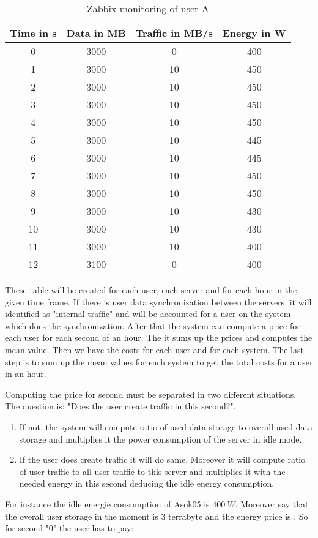  
 \begin{table}
 \centering
 \caption{Zabbix monitoring of user A}
 \begin{tabular}{|c|c|c|c|}
  \hline Time in s & Data in MB & Traffic in MB/s & Energy in W \\ 
   \hline 0 & 3000 & 0 & 400 \\ 
  \hline 1 & 3000 & 10 & 450 \\ 
  \hline 2 & 3000 & 10 & 450 \\ 
  \hline 3 & 3000 & 10 & 450\\ 
  \hline 4 & 3000 & 10 & 450 \\ 
  \hline 5 & 3000 & 10 & 445 \\
  \hline 6 & 3000 & 10 & 445 \\ 
  \hline 7 & 3000 & 10 & 450\\ 
  \hline 8 & 3000 & 10 & 450 \\ 
  \hline 9 & 3000 & 10 & 430 \\  
  \hline 10 & 3000 & 10 & 430 \\
   \hline 11 & 3000 & 10 & 400 \\
  \hline 12 & 3100 & 0 & 400 \\  
  \hline 
  \end{tabular}
  \label{tb2} 
  \end{table}
  
  These table will be created for each user, each server and for each hour in the given time frame. If there is user data synchronization between the servers, it will identified as "internal traffic" and will be accounted for a user on the system which does the synchronization. After that the system can compute a price for each user for each second of an hour. The it sums up the prices and computes the mean value. Then we have the costs for each user and for each system. The last step is to sum up the mean values for each system to get the total costs for a user in an hour.
  
  Computing the price for second must be separated in two different situations. The question is: "Does the user create traffic in this second?".
  \begin{enumerate}
	\item
	If not, the system will compute ratio of used data storage to overall used data storage and multiplies it the power consumption of the server in idle mode.
	\item
	If the user does create traffic it will do same. Moreover it will compute ratio of user traffic to all user traffic to this server and multiplies it with the needed energy in this second deducing the idle energy consumption.
  \end{enumerate}
     For instance the idle energie consumption of Asok05 is $400\ W$. Moreover say that the overall user storage in the moment is 3 terrabyte and the energy price is . So for second "0" the user has to pay:
    
